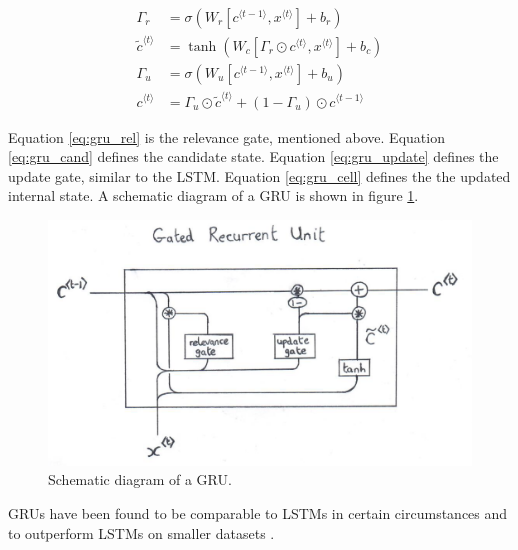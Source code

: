 \documentclass[a4paper,12pt]{article}
\theoremstyle{definition}
\begin{document}
\begin{align}
	\Gamma_r &= \sigma(W_r[c^{\langle t-1 \rangle}, x^{\langle t \rangle}] + b_r) \label{eq:gru_rel} \\
	\tilde{c}^{\langle t \rangle} &= \tanh(W_c[\Gamma_r \odot c^{\langle t \rangle},x^{\langle t \rangle}] + b_c) \label{eq:gru_cand} \\
	\Gamma_u &= \sigma(W_u[c^{\langle t-1 \rangle}, x^{\langle t \rangle}] + b_u) \label{eq:gru_update} \\
	c^{\langle t \rangle} &= \Gamma_u \odot \tilde{c}^{\langle t \rangle} + (1 - \Gamma_u) \odot c^{\langle t-1 \rangle} \label{eq:gru_cell}
\end{align}

Equation \ref{eq:gru_rel} is the relevance gate, mentioned above. Equation \ref{eq:gru_cand} defines the candidate state. Equation \ref{eq:gru_update} defines the update gate, similar to the LSTM. Equation \ref{eq:gru_cell} defines the the updated internal state. A schematic diagram of a GRU is shown in figure \ref{fig:gru}.

\begin{figure}[ht]
	\centering
	\includegraphics[width=\textwidth]{figures/gru.png}
	\caption{Schematic diagram of a GRU.}
	\label{fig:gru}
\end{figure}

GRUs have been found to be comparable to LSTMs in certain circumstances and to outperform LSTMs on smaller datasets \cite{chung}. 
\end{document}

